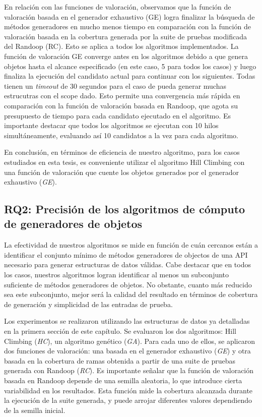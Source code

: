 En relación con las funciones de valoración, observamos que la función de valoración basada en el generador exhaustivo (GE) logra 
finalizar la búsqueda de métodos generadores en mucho menos tiempo en comparación con la función de valoración basada en la 
cobertura generada por la suite de pruebas modificada del Randoop (RC). Esto se aplica a todos los algoritmos implementados. La función 
de valoración GE converge antes en los algoritmos debido a que genera objetos hasta el alcance especificado (en este caso, 5 para todos 
los casos) y luego finaliza la ejecución del candidato actual para continuar con los siguientes. Todas tienen un \emph{timeout} de 
30 segundos para el caso de pueda generar muchas estrucutras con el scope dado. Esto permite una convergencia más rápida en comparación 
con la función de valoración basada en Randoop, que agota su presupuesto de tiempo para cada candidato ejecutado en el algoritmo. Es 
importante destacar que todos los algoritmos se ejecutan con 10 hilos simultáneamente, evaluando así 10 candidatos a la vez para cada 
algoritmo.

En conclusión, en términos de eficiencia de nuestro algoritmo, para los casos estudiados en esta tesis, es conveniente utilizar el 
algoritmo Hill Climbing con una función de valoración que cuente los objetos generados por el generador exhaustivo (\emph{GE}).


\subsection{RQ2: Precisión de los algoritmos de cómputo de generadores de objetos}

La efectividad de nuestros algoritmos se mide en función de cuán cercanos están a identificar el conjunto mínimo de métodos 
generadores de objectos de una API necesario para generar estructuras de datos válidas. 
Cabe destacar que en todos los casos, nuestros algoritmos 
logran identificar al menos un subconjunto suficiente de métodos generadores de objetos. No obstante, cuanto más reducido sea este 
subconjunto, mejor será la calidad del resultado en términos de cobertura de generación y simplicidad de las entradas de prueba.

Los experimentos se realizaron utilizando las estructuras de datos ya detalladas en la primera sección de este capítulo. Se evaluaron 
los dos algoritmos: Hill Climbing (\emph{HC}), un algoritmo genético (\emph{GA}). Para cada uno de ellos, 
se aplicaron dos funciones de valoración: una basada en el generador exhaustivo 
(\emph{GE}) y otra basada en la cobertura de ramas obtenida a partir de una suite de pruebas generada con Randoop (\emph{RC}).
Es importante señalar que la función de valoración basada en Randoop depende de una semilla aleatoria, lo que introduce cierta 
variabilidad en los resultados. Esta función mide la cobertura alcanzada durante la ejecución de la suite generada, y puede arrojar 
diferentes valores dependiendo de la semilla inicial.

